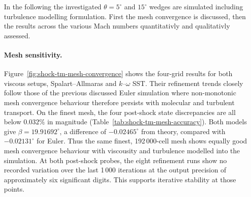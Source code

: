 In the following the investigated \(\theta= 5^\circ\) and \(15^\circ\) wedges are simulated including turbulence modelling formulation. First the mesh convergence is discussed, then the results across the various Mach numbers quantitativly and qualitativly assessed.

\paragraph{Mesh sensitivity.}
Figure~\ref{fig:shock-tm-mesh-convergence} shows the four-grid results for both
viscous setups, Spalart--Allmaras and \(k\)--\(\omega\) SST. Their refinement trends closely follow those of the previous discussed Euler simulation where non-monotonic mesh convergence behaviour therefore persists with molecular and turbulent transport. On the finest mesh, the four post-shock state discrepancies are all below \(0.032\%\) in magnitude (Table~\ref{tab:shock-tm-mesh-accuracy}). Both models give \(\beta=19.91692^\circ\), a difference of \(-0.02465^\circ\) from theory, compared with \(-0.02131^\circ\) for Euler. Thus the same finest, 192\,000-cell mesh shows equally good mesh convergence behaviour with viscousity and turbulence modelled into the simulation. At both post-shock probes, the eight refinement runs show no recorded variation over the last 1\,000 iterations at the output precision of approximately six significant digits. This supports iterative stability at those points.

